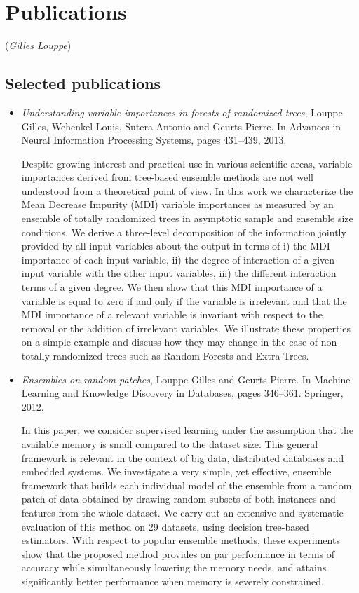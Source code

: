 \chapter{Publications}

\vspace{-3.5em}
\hfill (\textit{Gilles Louppe})
\vspace{1em}


\section{Selected publications}

\begin{itemize}

\item \citep{louppe:2013} \textit{Understanding variable importances in forests of randomized trees},
Louppe Gilles, Wehenkel Louis, Sutera Antonio and Geurts Pierre.
In Advances in Neural Information Processing Systems, pages 431--439, 2013.

Despite growing interest and practical use in various scientific areas, variable importances derived from tree-based ensemble methods are not well understood from a theoretical point of view. In this work we characterize the Mean Decrease Impurity (MDI) variable importances as measured by an ensemble of totally randomized trees in asymptotic sample and ensemble size conditions. We derive a three-level decomposition of the information jointly provided by all input variables about the output in terms of i) the MDI importance of each input variable, ii) the degree of interaction of a given input variable with the other input variables, iii) the different interaction terms of a given degree. We then show that this MDI importance of a variable is equal to zero if and only if the variable is irrelevant and that the MDI importance of a relevant variable is invariant with respect to the removal or the addition of irrelevant variables. We illustrate these properties on a simple example and discuss how they may change in the case of non-totally randomized trees such as Random Forests and Extra-Trees.

\item \citep{louppe:2012} \textit{Ensembles on random patches},
Louppe Gilles and Geurts Pierre.
In Machine Learning and Knowledge Discovery in Databases, pages 346--361. Springer, 2012.

In this paper, we consider supervised learning under the assumption that the available memory is small compared to the dataset size. This general framework is relevant in the context of big data, distributed databases and embedded systems. We investigate a very simple, yet effective, ensemble framework that builds each individual model of the ensemble from a random patch of data obtained by drawing random subsets of both instances and features from the whole dataset. We carry out an extensive and systematic evaluation of this method on 29 datasets, using decision tree-based estimators. With respect to popular ensemble methods, these experiments show that the proposed method provides on par performance in terms of accuracy while simultaneously lowering the memory needs, and attains significantly better performance when memory is severely constrained.


\end{itemize}
